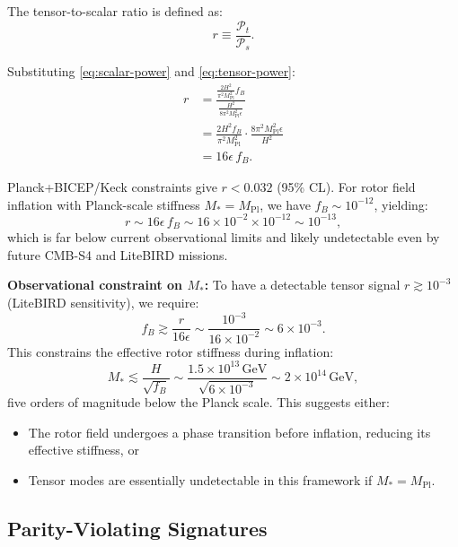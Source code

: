 \documentclass[11pt,a4paper]{article}
\numberwithin{equation}{section}
\theoremstyle{plain}
\theoremstyle{definition}
\theoremstyle{remark}
\begin{document}
The tensor-to-scalar ratio is defined as:
\begin{equation}
r \equiv \frac{\mathcal{P}_t}{\mathcal{P}_s}.
\label{eq:r-def}
\end{equation}

Substituting \eqref{eq:scalar-power} and \eqref{eq:tensor-power}:
\begin{align}
r &= \frac{\frac{2H^2}{\pi^2 M_{\mathrm{Pl}}^2}f_B}{\frac{H^2}{8\pi^2 M_{\mathrm{Pl}}^2\epsilon}}\\
&= \frac{2H^2 f_B}{\pi^2 M_{\mathrm{Pl}}^2}\cdot\frac{8\pi^2 M_{\mathrm{Pl}}^2\epsilon}{H^2}\\
&= 16\epsilon\,f_B.
\label{eq:tensor-to-scalar}
\end{align}

Planck+BICEP/Keck constraints give $r < 0.032$ (95\% CL). For rotor field inflation with Planck-scale stiffness $M_* = M_{\mathrm{Pl}}$, we have $f_B \sim 10^{-12}$, yielding:
\begin{equation}
r \sim 16\epsilon\, f_B \sim 16 \times 10^{-2} \times 10^{-12} \sim 10^{-13},
\end{equation}
which is far below current observational limits and likely undetectable even by future CMB-S4 and LiteBIRD missions.

\textbf{Observational constraint on $M_*$:} To have a detectable tensor signal $r \gtrsim 10^{-3}$ (LiteBIRD sensitivity), we require:
\begin{equation}
f_B \gtrsim \frac{r}{16\epsilon} \sim \frac{10^{-3}}{16 \times 10^{-2}} \sim 6 \times 10^{-3}.
\end{equation}
This constrains the effective rotor stiffness during inflation:
\begin{equation}
M_* \lesssim \frac{H}{\sqrt{f_B}} \sim \frac{1.5 \times 10^{13}\,\text{GeV}}{\sqrt{6 \times 10^{-3}}} \sim 2 \times 10^{14}\,\text{GeV},
\end{equation}
five orders of magnitude below the Planck scale. This suggests either:
\begin{itemize}
  \item The rotor field undergoes a phase transition before inflation, reducing its effective stiffness, or
  \item Tensor modes are essentially undetectable in this framework if $M_* = M_{\mathrm{Pl}}$.
\end{itemize}

\subsection{Parity-Violating Signatures}
\end{document}

